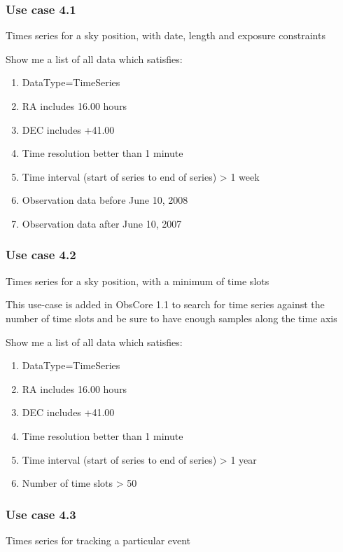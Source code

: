 \documentclass[11pt,a4paper]{ivoa}
\begin{document}
\subsubsection[Use case 4.1]{Use case 4.1}
Times series for a sky position, with date, length and exposure constraints

Show me a list of all data which satisfies:

\begin{enumerate}
\item DataType=TimeSeries
\item RA includes 16.00 hours
\item DEC includes +41.00
\item Time resolution better than 1 minute
\item Time interval (start of series to end of series) {\textgreater} 1 week
\item Observation data before June 10, 2008
\item Observation data after June 10, 2007
\end{enumerate}

\subsubsection{Use case 4.2}
Times series for a sky position, with a minimum of time slots

This use-case is added in ObsCore 1.1 to search for time series against the number of time slots and be sure to have
enough samples along the time axis

Show me a list of all data which satisfies:

\begin{enumerate}
\item DataType=TimeSeries
\item RA includes 16.00 hours
\item DEC includes +41.00
\item Time resolution better than 1 minute
\item Time interval (start of series to end of series) {\textgreater} 1 year
\item Number of time slots {\textgreater} 50
\end{enumerate}

\subsubsection{Use case 4.3}
Times series for tracking a particular event
\end{document}
